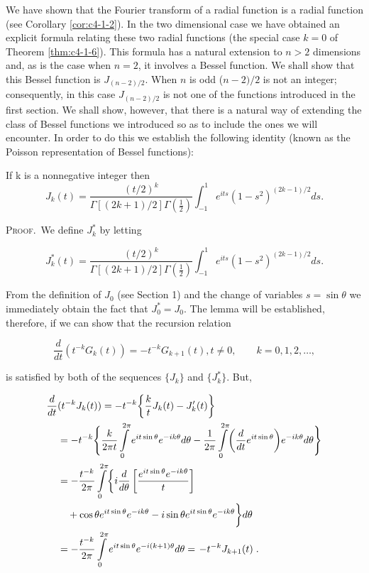We have shown that the Fourier transform of a radial function is a radial function (see Corollary \ref{cor:c4-1-2}). In the two dimensional case we have obtained an explicit formula relating these two radial functions (the special case $k=0$ of Theorem \ref{thm:c4-1-6}). This formula has a natural extension to $n>2$ dimensions and, as is the case when $n=2$, it involves a Bessel function. We shall show that this Bessel function is $J_{(n-2)/2}$. When $n$ is odd ($n-2)/2$ is not an integer; consequently, in this case $J_{(n-2)/2}$ is not one of the functions introduced in the first section. We shall show, however, that there is a natural way of extending the class of Bessel functions we introduced so as to include the ones we will encounter. In order to do this we establish the following identity (known as the Poisson representation of Bessel functions):

\begin{lemma}
\label{lem:c4-3-1}
If k is a nonnegative integer then
\[
J_{k}(t)=\frac{(t/2)^{k}}{\Gamma[(2k+1)/2]\Gamma(\frac{1}{2})}\int_{-1}^{1}e^{i t s}(1-s^{2})^{(2k-1)/2}d s.
\]

\end{lemma}

\textsc{Proof.}\ We define $J_k^*$ by letting

\[
J_{k}^{*}(t)=\frac{(t/2)^{k}}{\Gamma[(2k+1)/2]\Gamma(\frac{1}{2})}\int_{-1}^{1}e^{i t s}(1-s^{2})^{(2k-1)/2}d s.
\]

From the definition of $J_0$ (see Section 1) and the change of variables $s = \sin \theta$ we immediately obtain the fact that $J_0^* = J_0$. The lemma will be established, therefore, if we can show that the recursion relation

\begin{equation}\label{eq:c4-3-2}
\frac{d}{d t}\left(t^{-k}G_{k}(t)\right)=-t^{-k}G_{k+1}(t),t\neq0,\qquad k=0,1,2,\ldots,
\end{equation}

is satisfied by both of the sequences $\{J_{k}\}$ and $\{J_{k}^{*}\}$. But,

\[
\begin{aligned}{\frac{d}{d t}}&{{}(t^{-k}J_{k}(t))=-t^{-k}\biggl\{\frac{k}{t}J_{k}(t)-J_{k}^{\prime}(t)\biggr\}}\\ {}&{{}=-t^{-k}\Biggl\{\frac{k}{2\pi t}\intop_{0}^{2\pi}e^{i t\sin\theta}e^{-i k\theta}d\theta-\frac{1}{2\pi}\intop_{0}^{2\pi}\biggl(\frac{d}{d t}e^{i t\sin\theta}\biggr)e^{-i k\theta}d\theta\Biggr\}}\\ {}&{{}=-\frac{t^{-k}}{2\pi}\intop_{0}^{2\pi}\biggl\{i\frac{d}{d\theta}\left[\frac{e^{i t\sin\theta}e^{-i k\theta}}{t}\right]}\\
 {}&{{}\quad+\cos\theta e^{i t\sin\theta}e^{-i k\theta}-i\sin\theta e^{i t\sin\theta}e^{-i k\theta}\biggr\}d\theta}\\ {}&{{}=-\frac{t^{-k}}{2\pi}\intop_{0}^{2\pi}e^{i t\sin\theta}e^{-i(k+1)\theta}d\theta=\left.-t^{-k}J_{k+1}(t)\right..}\\ \end{aligned}
\]

